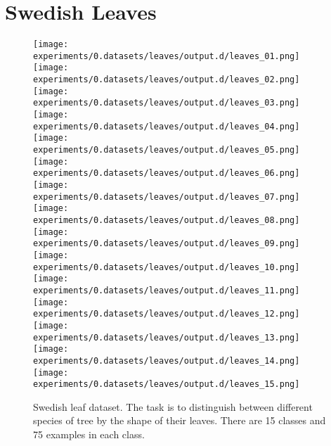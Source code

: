 
\FloatBarrier

\section{Swedish Leaves}

\begin{figure}
\texttt{[image: experiments/0.datasets/leaves/output.d/leaves\_01.png]}
\hfill
\texttt{[image: experiments/0.datasets/leaves/output.d/leaves\_02.png]}
\\\vspace{3\baselineskip}
\texttt{[image: experiments/0.datasets/leaves/output.d/leaves\_03.png]}
\hfill
\texttt{[image: experiments/0.datasets/leaves/output.d/leaves\_04.png]}
\\\vspace{3\baselineskip}
\texttt{[image: experiments/0.datasets/leaves/output.d/leaves\_05.png]}
\hfill
\texttt{[image: experiments/0.datasets/leaves/output.d/leaves\_06.png]}
\\\vspace{3\baselineskip}
\texttt{[image: experiments/0.datasets/leaves/output.d/leaves\_07.png]}
\hfill
\texttt{[image: experiments/0.datasets/leaves/output.d/leaves\_08.png]}
\\\vspace{3\baselineskip}
\texttt{[image: experiments/0.datasets/leaves/output.d/leaves\_09.png]}
\hfill
\texttt{[image: experiments/0.datasets/leaves/output.d/leaves\_10.png]}
\\\vspace{3\baselineskip}
\texttt{[image: experiments/0.datasets/leaves/output.d/leaves\_11.png]}
\hfill
\texttt{[image: experiments/0.datasets/leaves/output.d/leaves\_12.png]}
\\\vspace{3\baselineskip}
\texttt{[image: experiments/0.datasets/leaves/output.d/leaves\_13.png]}
\hfill
\texttt{[image: experiments/0.datasets/leaves/output.d/leaves\_14.png]}
\\\vspace{3\baselineskip}
\texttt{[image: experiments/0.datasets/leaves/output.d/leaves\_15.png]}
\caption{Swedish leaf dataset. The task is to distinguish between different species of tree by the shape of their leaves. There are 15 classes and 75 examples in each class.}
\end{figure}